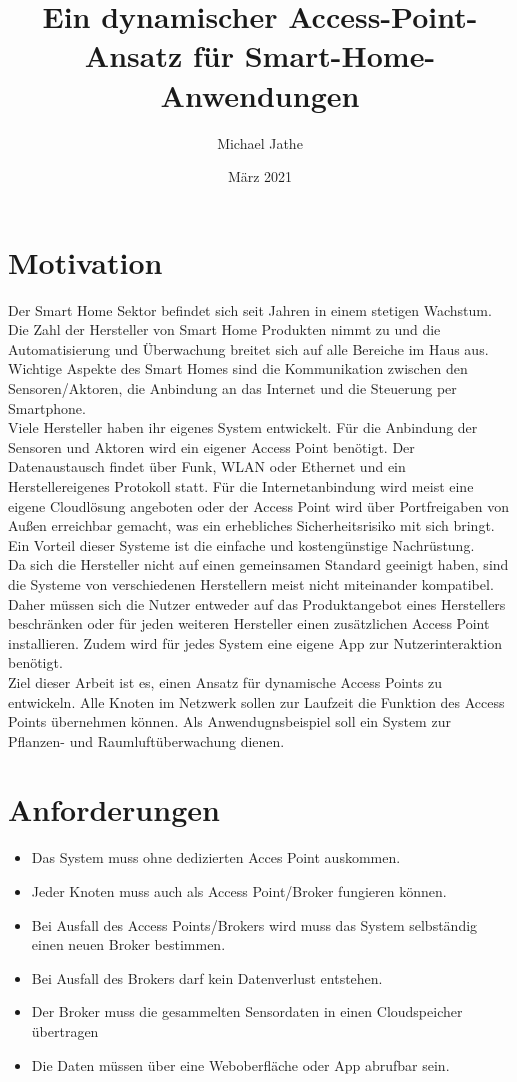 \documentclass{article}
\title{Ein dynamischer Access-Point-Ansatz für Smart-Home-Anwendungen}
\author{Michael Jathe}
\date{März 2021}
\begin{document}
\maketitle

\section{Motivation}
Der Smart Home Sektor befindet sich seit Jahren in
einem stetigen Wachstum. Die Zahl der Hersteller von
Smart Home Produkten nimmt zu und die Automatisierung
und Überwachung breitet sich auf alle Bereiche
im Haus aus.\\

Wichtige Aspekte des Smart Homes sind die Kommunikation
zwischen den Sensoren/Aktoren, die Anbindung an das
Internet und die Steuerung per Smartphone.\\

Viele Hersteller haben ihr eigenes System
entwickelt. Für die Anbindung der Sensoren und Aktoren
wird ein eigener Access Point benötigt. Der Datenaustausch
findet über Funk, WLAN oder Ethernet und ein Herstellereigenes
Protokoll statt. Für die Internetanbindung wird
meist eine eigene Cloudlösung angeboten oder der Access
Point wird über Portfreigaben von Außen erreichbar gemacht,
was ein erhebliches Sicherheitsrisiko mit sich bringt. Ein
Vorteil dieser Systeme ist die einfache und kostengünstige
Nachrüstung.\\

Da sich die Hersteller nicht auf einen gemeinsamen Standard
geeinigt haben, sind die Systeme von verschiedenen
Herstellern meist nicht miteinander kompatibel. Daher müssen
sich die Nutzer entweder auf das Produktangebot eines Herstellers
beschränken oder für jeden weiteren Hersteller einen
zusätzlichen Access Point installieren. Zudem wird für jedes System
eine eigene App zur Nutzerinteraktion benötigt.\\

Ziel dieser Arbeit ist es, einen Ansatz für dynamische Access Points zu entwickeln. Alle Knoten im Netzwerk sollen zur Laufzeit die Funktion des Access Points übernehmen können. Als Anwendugnsbeispiel soll ein System zur Pflanzen- und Raumluftüberwachung dienen. 
\section{Anforderungen}
\begin{itemize}
    \item Das System muss ohne dedizierten Acces Point auskommen.
    \item Jeder Knoten muss auch als Access Point/Broker fungieren können.
    \item Bei Ausfall des Access Points/Brokers wird muss das System selbständig einen neuen Broker bestimmen.
    \item Bei Ausfall des Brokers darf kein Datenverlust entstehen.
    \item Der Broker muss die gesammelten Sensordaten in einen Cloudspeicher übertragen
    \item Die Daten müssen über eine Weboberfläche oder App abrufbar sein.

\end{itemize}
\end{document}
